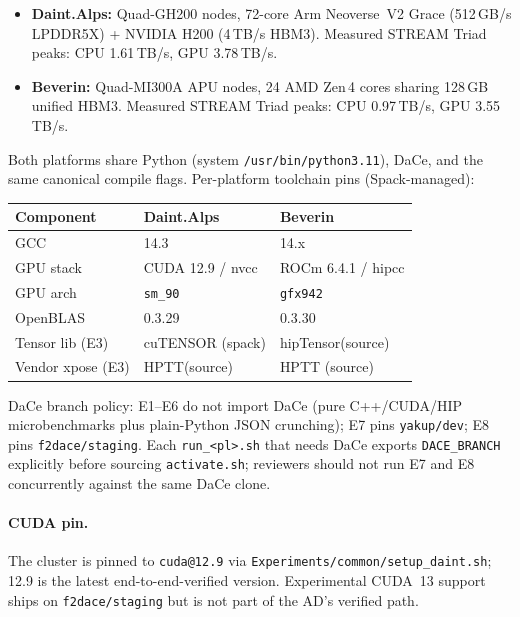 \documentclass[conference]{IEEEtran}
\begin{document}
\begin{itemize}
\item \textbf{Daint.Alps:} Quad-GH200 nodes, 72-core Arm Neoverse~V2 Grace (512\,GB/s LPDDR5X) + NVIDIA H200 (4\,TB/s HBM3). Measured STREAM Triad peaks: CPU 1.61\,TB/s, GPU 3.78\,TB/s.
\item \textbf{Beverin:} Quad-MI300A APU nodes, 24 AMD Zen\,4 cores sharing 128\,GB unified HBM3. Measured STREAM Triad peaks: CPU 0.97\,TB/s, GPU 3.55\,TB/s.
\end{itemize}


Both platforms share Python (system \texttt{/usr/bin/python3.11}), DaCe, and the same canonical compile flags. Per-platform toolchain pins (Spack-managed):

\begin{center}
\small
\begin{tabular}{lll}
\toprule
Component & Daint.Alps & Beverin \\
\midrule
GCC          & 14.3              & 14.x              \\
GPU stack    & CUDA 12.9 / nvcc  & ROCm 6.4.1 / hipcc \\
GPU arch     & \texttt{sm\_90}   & \texttt{gfx942}   \\
OpenBLAS     & 0.3.29            & 0.3.30            \\
Tensor lib (E3) & cuTENSOR (spack) & hipTensor\footnotemark[1] (source) \\
Vendor xpose (E3) & HPTT\footnotemark[2] (source) & HPTT (source) \\
\bottomrule
\end{tabular}
\end{center}

\noindent DaCe branch policy: E1--E6 do not import DaCe (pure C++/CUDA/HIP microbenchmarks plus plain-Python JSON crunching); E7 pins \texttt{yakup/dev}; E8 pins \texttt{f2dace/staging}. Each \texttt{run\_<pl>.sh} that needs DaCe exports \texttt{DACE\_BRANCH} explicitly before sourcing \texttt{activate.sh}; reviewers should not run E7 and E8 concurrently against the same DaCe clone.

\paragraph{CUDA pin.} The cluster is pinned to \texttt{cuda@12.9} via \texttt{Experiments/common/setup\_daint.sh}; 12.9 is the latest end-to-end-verified version. Experimental CUDA~13 support ships on \texttt{f2dace/staging} but is not part of the AD's verified path.
\end{document}
